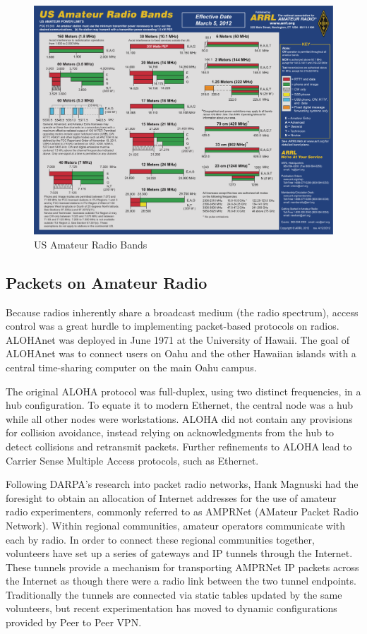 \documentclass[letter,12pt]{article}
\begin{document}
		\begin{figure}[h!]
			\centering
			\includegraphics[width=\textwidth]{./PNGs/Amateur_Spectrum.png}
			\caption{US Amateur Radio Bands \cite{ARRL_Chart}}
			\label{ARRL_Chart}
		\end{figure}
		
	\subsection{Packets on Amateur Radio}
		Because radios inherently share a broadcast medium (the radio spectrum), access control was a great hurdle to implementing packet-based protocols on radios.  ALOHAnet was deployed in June 1971 at the University of Hawaii. \cite{Schwartz_09} The goal of ALOHAnet was to connect users on Oahu and the other Hawaiian islands with a central time-sharing computer on the main Oahu campus.  
		
		The original ALOHA protocol was full-duplex, using two distinct frequencies, in a hub configuration.  To equate it to modern Ethernet, the central node was a hub while all other nodes were workstations.  ALOHA did not contain any provisions for collision avoidance, instead relying on acknowledgments from the hub to detect collisions and retransmit packets. Further refinements to ALOHA lead to Carrier Sense Multiple Access protocols, such as Ethernet. \cite{Binder_75}
		
		Following DARPA's research into packet radio networks, Hank Magnuski had the foresight to obtain an allocation of Internet addresses for the use of amateur radio experimenters, commonly referred to as AMPRNet (AMateur Packet Radio Network). Within regional communities, amateur operators communicate with each by radio.  In order to connect these regional communities together, volunteers have set up a series of gateways and IP tunnels through the Internet.  These tunnels provide a mechanism for transporting AMPRNet IP packets across the Internet as though there were a radio link between the two tunnel endpoints. Traditionally the tunnels are connected via static tables updated by the same volunteers, but recent experimentation has moved to dynamic configurations provided by Peer to Peer VPN. \cite{Kantor_11}
	
\end{document}
